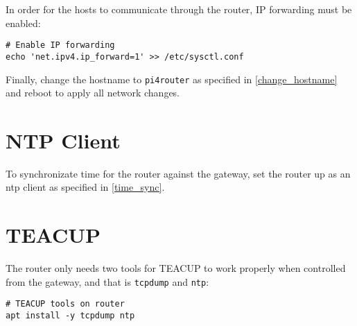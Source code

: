 In order for the hosts to communicate through the router, IP forwarding must be enabled:

\begin{lstlisting}
# Enable IP forwarding
echo 'net.ipv4.ip_forward=1' >> /etc/sysctl.conf
\end{lstlisting}

Finally, change the hostname to \lstinline{pi4router} as specified in \ref{change_hostname} and reboot to apply all network changes.


\section{NTP Client}

To synchronizate time for the router against the gateway, set the router up as an \gls{ntp} client as specified in \ref{time_sync}.


\section{TEACUP}

The router only needs two tools for TEACUP to work properly when controlled from the gateway, and that is \lstinline{tcpdump} and \lstinline{ntp}:

\begin{lstlisting}
# TEACUP tools on router
apt install -y tcpdump ntp
\end{lstlisting}
